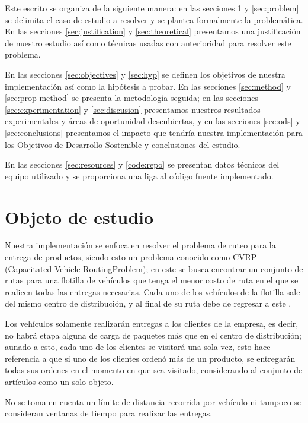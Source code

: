 \documentclass[journal]{IEEEtran}
\begin{document}
        Este escrito se organiza de la siguiente manera: en las secciones \ref{sec:case-study} y \ref{sec:problem} se delimita el caso de estudio a resolver y se plantea formalmente la problemática. En las secciones \ref{sec:justification} y \ref{sec:theoretical} presentamos una justificación de nuestro estudio así como técnicas usadas con anterioridad para resolver este problema.

        En las secciones \ref{sec:objectives} y \ref{sec:hyp} se definen los objetivos de nuestra implementación así como la hipótesis a probar. En las secciones \ref{sec:method} y \ref{sec:prop-method} se presenta la metodología seguida; en las secciones \ref{sec:experimentation} y \ref{sec:discusion} presentamos nuestros resultados experimentales y áreas de oportunidad descubiertas, y en las secciones \ref{sec:ods} y \ref{sec:conclusions} presentamos el impacto que tendría nuestra implementación para los Objetivos de Desarrollo Sostenible y conclusiones del estudio.

        En las secciones \ref{sec:resources} y \ref{code:repo} se presentan datos técnicos del equipo utilizado y se proporciona una liga al código fuente implementado.
        
    \section{Objeto de estudio} \label{sec:case-study}

        Nuestra implementación se enfoca en resolver el problema de ruteo para la entrega de productos, siendo esto un problema conocido como CVRP (Capacitated Vehicle RoutingProblem); en este se busca encontrar un conjunto de rutas para una flotilla de vehículos que tenga el menor costo de ruta en el que se realicen todas las entregas necesarias. Cada uno de los vehículos de la flotilla sale del mismo centro de distribución, y al final de su ruta debe de regresar a este \cite{elshaer2020taxonomic}.

        Los vehículos solamente realizarán entregas a los clientes de la empresa, es decir, no habrá etapa alguna de carga de paquetes más que en el centro de distribución; aunado a esto, cada uno de los clientes se visitará una sola vez, esto hace referencia a que si uno de los clientes ordenó más de un producto, se entregarán todas sus ordenes en el momento en que sea visitado, considerando al conjunto de artículos como un solo objeto.
        
        No se toma en cuenta un límite de distancia recorrida por vehículo ni tampoco se consideran ventanas de tiempo para realizar las entregas.
    
\end{document}

